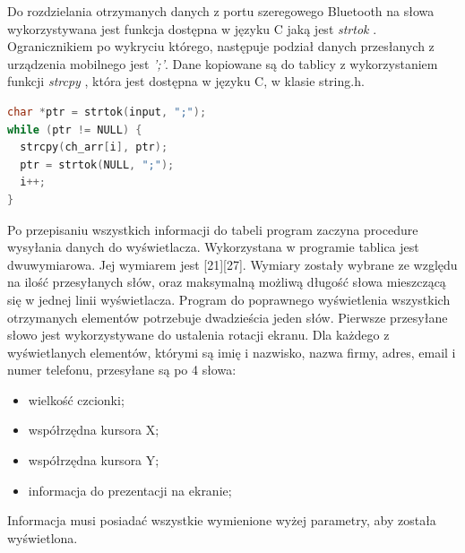 \documentclass[a4paper,12pt, twoside]{article}
\begin{document}
    	Do rozdzielania otrzymanych danych z portu szeregowego Bluetooth na słowa wykorzystywana jest funkcja dostępna w języku C jaką jest \textit{strtok} \cite{strtok}. \label{petladekod}Ogranicznikiem po wykryciu którego, następuje podział danych przesłanych z urządzenia mobilnego jest \textit{';'}. Dane kopiowane są do tablicy z wykorzystaniem funkcji \textit{strcpy} \cite{strcpy}, która jest dostępna w języku C, w klasie string.h. 
    \begin{lstlisting}[language=C++, label={lst:petlaprzepisujaca}, caption=Działanie pętli przepisującej otrzymane dane do tablicy]
char *ptr = strtok(input, ";");
while (ptr != NULL) {
  strcpy(ch_arr[i], ptr);
  ptr = strtok(NULL, ";");
  i++;
}\end{lstlisting}
    
        Po przepisaniu wszystkich informacji do tabeli program zaczyna procedure wysyłania danych do wyświetlacza. Wykorzystana w programie tablica jest dwuwymiarowa. Jej wymiarem jest [21][27]. Wymiary zostały wybrane ze względu na ilość przesyłanych słów,  oraz maksymalną możliwą długość słowa mieszczącą się w jednej linii wyświetlacza. Program do poprawnego wyświetlenia wszystkich otrzymanych elementów potrzebuje dwadzieścia jeden słów. Pierwsze przesyłane słowo jest wykorzystywane do ustalenia rotacji ekranu. Dla każdego z wyświetlanych elementów, którymi są imię i nazwisko, nazwa firmy, adres, email i numer telefonu, przesyłane są po 4 słowa:
        \begin{itemize}
            \item wielkość czcionki;
            \item współrzędna kursora X;
            \item współrzędna kursora Y;
            \item informacja do prezentacji na ekranie;
        \end{itemize}
    
    	Informacja musi posiadać wszystkie wymienione wyżej parametry, aby została wyświetlona.
    	
\end{document}
